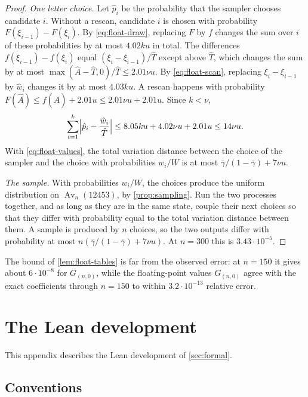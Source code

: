 \documentclass[11pt,reqno]{amsart}
\theoremstyle{definition}
\theoremstyle{remark}
\newcommand{\Av}{\operatorname{Av}}
\begin{document}
\begin{proof}
\emph{One letter choice.}  Let $\hat p_i$ be the probability that the
sampler chooses candidate $i$.  Without a rescan, candidate $i$ is chosen
with probability $F(\xi_{i-1})-F(\xi_i)$.  By \eqref{eq:float-draw},
replacing $F$ by $f$ changes the sum over $i$ of these probabilities by at
most $4.02ku$ in total.  The differences $f(\xi_{i-1})-f(\xi_i)$ equal
$(\xi_i-\xi_{i-1})/\hat T$ except above $\hat T$, which changes the sum
by at most $\max(\hat A-\hat T,0)/\hat T\leq2.01\nu u$.  By
\eqref{eq:float-scan}, replacing $\xi_i-\xi_{i-1}$ by $\hat w_i$ changes
it by at most $4.03ku$.  A rescan happens with probability
$F(\hat A)\leq f(\hat A)+2.01u\leq2.01\nu u+2.01u$.  Since $k<\nu$,
\[
 \sum_{i=1}^k\Bigl|\hat p_i-\frac{\hat w_i}{\hat T}\Bigr|
 \leq8.05ku+4.02\nu u+2.01u\leq14\nu u.
\]
With \eqref{eq:float-values}, the total variation distance between the
choice of the sampler and the choice with probabilities $w_i/W$ is at most
$\bar\gamma/(1-\bar\gamma)+7\nu u$.

\emph{The sample.}  With probabilities $w_i/W$, the choices produce the
uniform distribution on $\Av_n(12453)$, by \cref{prop:sampling}.  Run the
two processes together, and as long as they are in the same state, couple
their next choices so that they differ with probability equal to the total
variation distance between them.  A sample is produced by $n$ choices, so
the two outputs differ with probability at most
$n(\bar\gamma/(1-\bar\gamma)+7\nu u)$.  At $n=300$ this is
$3.43\cdot10^{-5}$.
\end{proof}

The bound of \cref{lem:float-tables} is far from the observed error: at
$n=150$ it gives about $6\cdot10^{-8}$ for $G_{(n,0)}$, while the
floating-point values $G_{(n,0)}$ agree with the exact coefficients
through $n=150$ to within $3.2\cdot10^{-13}$ relative error.

\section{The Lean development}\label{app:lean}

This appendix describes the Lean development of \cref{sec:formal}.

\subsection{Conventions}
\end{document}
